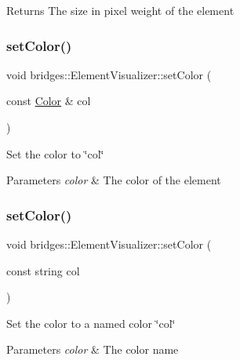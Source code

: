 \begin{DoxyReturn}{Returns}
The size in pixel weight of the element 
\end{DoxyReturn}
\mbox{\label{classbridges_1_1_element_visualizer_af14723066e52c159eebfb804d65dd825}} 
\subsubsection{\texorpdfstring{setColor()}{setColor()}\hspace{0.1cm}{\footnotesize\ttfamily [1/2]}}
{\footnotesize\ttfamily void bridges\+::\+Element\+Visualizer\+::set\+Color (\begin{DoxyParamCaption}\item[{const \mbox{\hyperlink{classbridges_1_1_color}{Color}} \&}]{col }\end{DoxyParamCaption})\hspace{0.3cm}{\ttfamily [inline]}}

Set the color to \char`\"{}col\char`\"{} 
\begin{DoxyParams}{Parameters}
{\em color} & The color of the element \\
\hline
\end{DoxyParams}
\mbox{\label{classbridges_1_1_element_visualizer_a7a0c8b8ce505265dcf622f2a884fac81}} 
\subsubsection{\texorpdfstring{setColor()}{setColor()}\hspace{0.1cm}{\footnotesize\ttfamily [2/2]}}
{\footnotesize\ttfamily void bridges\+::\+Element\+Visualizer\+::set\+Color (\begin{DoxyParamCaption}\item[{const string}]{col }\end{DoxyParamCaption})\hspace{0.3cm}{\ttfamily [inline]}}

Set the color to a named color \char`\"{}col\char`\"{} 
\begin{DoxyParams}{Parameters}
{\em color} & The color name \\
\hline
\end{DoxyParams}
\mbox{\label{classbridges_1_1_element_visualizer_ad06f2fd509f6b3474feeb4fa1fef38d5}} 
